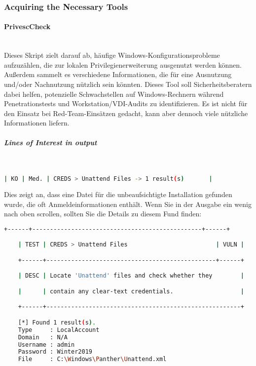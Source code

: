 \subsubsection{Acquiring the Necessary Tools}

\paragraph{PrivescCheck}\mbox{} \\
Dieses Skript zielt darauf ab, häufige Windows-Konfigurationsprobleme aufzuzählen, die zur lokalen Privilegienerweiterung ausgenutzt werden können. Außerdem sammelt es verschiedene Informationen, die für eine Ausnutzung und/oder Nachnutzung nützlich sein könnten.
Dieses Tool soll Sicherheitsberatern dabei helfen, potenzielle Schwachstellen auf Windows-Rechnern während Penetrationstests und Workstation/VDI-Audits zu identifizieren. Es ist nicht für den Einsatz bei Red-Team-Einsätzen gedacht, kann aber dennoch viele nützliche Informationen liefern.

\subparagraph{Lines of Interest in output}\mbox{} \\

\begin{lstlisting}[language=bash]
    | KO | Med. | CREDS > Unattend Files -> 1 result(s)       |
\end{lstlisting}

Dies zeigt an, dass eine Datei für die unbeaufsichtigte Installation gefunden wurde, die oft Anmeldeinformationen enthält. Wenn Sie in der Ausgabe ein wenig nach oben scrollen, sollten Sie die Details zu diesem Fund finden:

\begin{lstlisting}[language=bash]
    +------+------------------------------------------------+------+

    | TEST | CREDS > Unattend Files                         | VULN |

    +------+------------------------------------------------+------+

    | DESC | Locate 'Unattend' files and check whether they        |

    |      | contain any clear-text credentials.                   |

    +------+-------------------------------------------------------+

    [*] Found 1 result(s).
    Type     : LocalAccount
    Domain   : N/A
    Username : admin
    Password : Winter2019
    File     : C:\Windows\Panther\Unattend.xml
\end{lstlisting}

